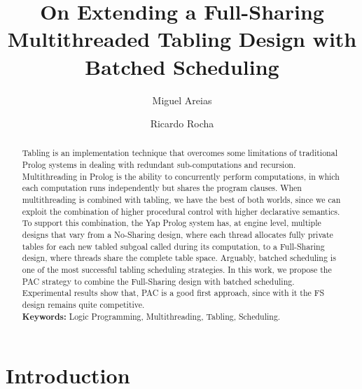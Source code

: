 \documentclass{llncs}
\begin{document}
\title{On Extending a Full-Sharing Multithreaded Tabling Design with
  Batched Scheduling}

\author{Miguel Areias \and Ricardo Rocha}


\maketitle


\begin{abstract}
Tabling is an implementation technique that overcomes some limitations
of traditional Prolog systems in dealing with redundant
sub-computations and recursion. Multithreading in Prolog is the
ability to concurrently perform computations, in which each
computation runs independently but shares the program clauses. When
multithreading is combined with tabling, we have the best of both
worlds, since we can exploit the combination of higher procedural
control with higher declarative semantics. To support this
combination, the Yap Prolog system has, at engine level, multiple
designs that vary from a No-Sharing design, where each thread
allocates fully private tables for each new tabled subgoal called
during its computation, to a Full-Sharing design, where threads share
the complete table space. Arguably, batched scheduling is one of the
most successful tabling scheduling strategies. In this work, we
propose the PAC strategy to combine the Full-Sharing design with
batched scheduling. Experimental results show that, PAC is a good
first approach, since with it the FS design remains quite
competitive.\\

\textbf{Keywords:} Logic Programming, Multithreading, Tabling, Scheduling.
\end{abstract}


\section{Introduction}
\end{document}
